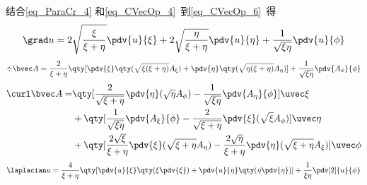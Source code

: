 结合\autoref{eq_ParaCr_4} 和\autoref{eq_CVecOp_4}~到\autoref{eq_CVecOp_6}~得
\begin{equation}
\grad u = 2\sqrt{\frac{\xi}{\xi + \eta}}\pdv{u}{\xi} + 2\sqrt{\frac{\eta}{\xi + \eta}}\pdv{u}{\eta} + \frac{1}{\sqrt{\xi\eta}}\pdv{u}{\phi}
\end{equation}
\begin{equation}
\div \bvec A = \frac{2}{\xi + \eta}\qty[\pdv{\xi}\qty(\sqrt{\xi(\xi+\eta)}A_\xi) + \pdv{\eta}\qty(\sqrt{\eta(\xi+\eta)}A_\eta)] + \frac{1}{\sqrt{\xi\eta}} \pdv{A_\phi}{\phi}
\end{equation}
\begin{equation}
\begin{aligned}
\curl \bvec A = &\qty[\frac{2}{\sqrt{\xi+\eta}}\pdv{\eta} (\sqrt{\eta}A_\phi) - \frac{1}{\sqrt{\xi\eta}}\pdv{A_\eta}{\phi}]\uvec \xi\\
&+\qty[\frac{1}{\sqrt{\xi\eta}}\pdv{A_\xi}{\phi} - \frac{2}{\sqrt{\xi+\eta}}\pdv{\xi}(\sqrt{\xi}A_\phi)]\uvec\eta\\
&+\qty[\frac{2\sqrt{\xi}}{\xi+\eta}\pdv{\xi}(\sqrt{\xi+\eta}A_\eta) - \frac{2\sqrt{\eta}}{\xi+\eta}\pdv{\eta}(\sqrt{\xi+\eta}A_\xi)]\uvec\phi
\end{aligned}
\end{equation}
\begin{equation} %
\laplacian u = \frac{4}{\xi + \eta} \qty[\pdv{u}{\xi}\qty(\xi\pdv{\xi}) + \pdv{u}{\eta}\qty(\eta\pdv{\eta})] + \frac{1}{\xi\eta}\pdv[2]{u}{\phi}
\end{equation}
